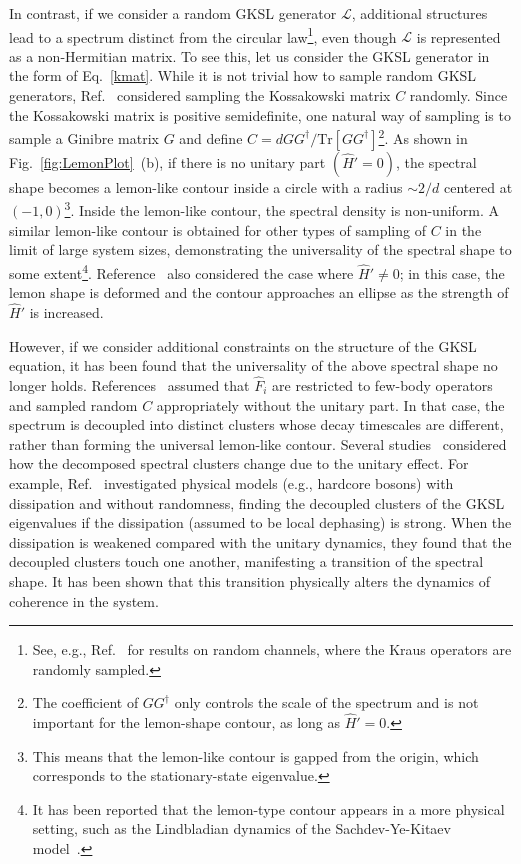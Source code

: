 \documentclass[preprint,pteplogo]{ptephy_v2}%
\numberwithin{equation}{section}
\theoremstyle{definition}
\begin{document}
In contrast, if we consider a random GKSL generator $\mathcal{L}$, additional structures lead to a spectrum distinct from the circular law\footnote{
See, e.g., Ref.~\cite{lancien2024limiting} for results on random channels, where the Kraus operators are randomly sampled.
}, even though $\mathcal{L}$ is represented as a non-Hermitian matrix.
To see this, let us consider the GKSL generator in the form of Eq.~\eqref{kmat}.
While it is not trivial how to sample random GKSL generators, Ref.~\cite{denisov2019universal} considered sampling the Kossakowski matrix $C$ randomly.
Since the Kossakowski matrix is positive semidefinite, one natural way of sampling is to sample a Ginibre matrix ${G}$ and define $C=d GG^\dag/\mathrm{Tr}[GG^\dag]$\footnote{
The coefficient of $GG^\dag$ only controls the scale of the spectrum and is not important for the lemon-shape contour, as long as $\hat{H}'=0$.
}.
As shown in Fig.~\ref{fig:LemonPlot}~(b), if there is no unitary part $(\hat{H}'=0)$, the spectral shape becomes a lemon-like contour inside a circle with a radius $\sim 2/d$ centered at $(-1,0)$\footnote{
This means that the lemon-like contour is gapped from the origin, which corresponds to the stationary-state eigenvalue.
}. 
Inside the lemon-like contour, the spectral density is non-uniform.
A similar lemon-like contour is obtained for other types of sampling of $C$ in the limit of large system sizes, demonstrating the universality of the spectral shape to some extent\footnote{
It has been reported that the lemon-type contour appears in a more physical setting, such as the Lindbladian dynamics of the Sachdev-Ye-Kitaev model~\cite{kulkarni2022lindbladian}.
}.
Reference~\cite{denisov2019universal} also considered the case where $\hat{H}'\neq 0$; in this case, the lemon shape is deformed and the contour approaches an ellipse as the strength of $\hat{H}'$ is increased.

However, if we consider additional constraints on the structure of the GKSL equation, it has been found that the universality of the above spectral shape no longer holds.
References~\cite{wang2020hierarchy, sommer2021many, li2022random} assumed that $\hat{F}_i$ are restricted to few-body operators and sampled random $C$ appropriately without the unitary part.
In that case, the spectrum is decoupled into distinct clusters whose decay timescales are different, rather than forming the universal lemon-like contour.
Several studies~\cite{haga2023quasiparticles, hartmann2024fate} considered how the decomposed spectral clusters change due to the unitary effect. 
For example, Ref.~\cite{haga2023quasiparticles} investigated physical models (e.g., hardcore bosons) with dissipation and without randomness, finding the decoupled clusters of the GKSL eigenvalues if the dissipation (assumed to be local dephasing) is strong.
When the dissipation is weakened compared with the unitary dynamics, they found that the decoupled clusters touch one another, manifesting a transition of the spectral shape.
It has been shown that this transition physically alters the dynamics of coherence in the system.
\end{document}
